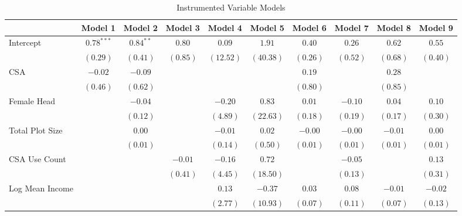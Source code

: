 \documentclass[
]{article}
\begin{document}
\begin{table}
\caption{Instrumented Variable Models}
\begin{center}
\begin{tabular}{l c c c c c c c c c}
\hline
 & Model 1 & Model 2 & Model 3 & Model 4 & Model 5 & Model 6 & Model 7 & Model 8 & Model 9 \\
\hline
Intercept            & $\mathbf{0.78}^{***}$ & $\mathbf{0.84}^{**}$ & $0.80$   & $0.09$    & $1.91$    & $0.40$   & $0.26$   & $0.62$   & $0.55$   \\
                     & $(0.29)$              & $(0.41)$             & $(0.85)$ & $(12.52)$ & $(40.38)$ & $(0.26)$ & $(0.52)$ & $(0.68)$ & $(0.40)$ \\
CSA                  & $-0.02$               & $-0.09$              &          &           &           & $0.19$   &          & $0.28$   &          \\
                     & $(0.46)$              & $(0.62)$             &          &           &           & $(0.80)$ &          & $(0.85)$ &          \\
Female Head          &                       & $-0.04$              &          & $-0.20$   & $0.83$    & $0.01$   & $-0.10$  & $0.04$   & $0.10$   \\
                     &                       & $(0.12)$             &          & $(4.89)$  & $(22.63)$ & $(0.18)$ & $(0.19)$ & $(0.17)$ & $(0.30)$ \\
Total Plot Size      &                       & $0.00$               &          & $-0.01$   & $0.02$    & $-0.00$  & $-0.00$  & $-0.01$  & $0.00$   \\
                     &                       & $(0.01)$             &          & $(0.14)$  & $(0.50)$  & $(0.01)$ & $(0.01)$ & $(0.01)$ & $(0.01)$ \\
CSA Use Count        &                       &                      & $-0.01$  & $-0.16$   & $0.72$    &          & $-0.05$  &          & $0.13$   \\
                     &                       &                      & $(0.41)$ & $(4.45)$  & $(18.50)$ &          & $(0.13)$ &          & $(0.31)$ \\
Log Mean Income      &                       &                      &          & $0.13$    & $-0.37$   & $0.03$   & $0.08$   & $-0.01$  & $-0.02$  \\
                     &                       &                      &          & $(2.77)$  & $(10.93)$ & $(0.07)$ & $(0.11)$ & $(0.07)$ & $(0.13)$ \\

\end{tabular}
\end{center}
\end{table}
\end{document}
